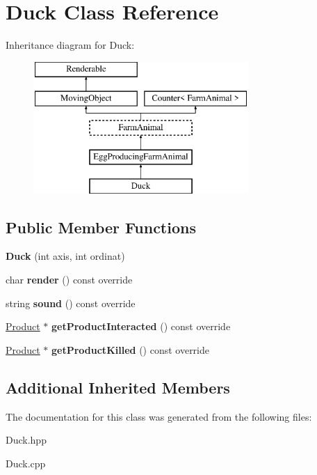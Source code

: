 \hypertarget{class_duck}{}\section{Duck Class Reference}
\label{class_duck}
Inheritance diagram for Duck\+:\begin{figure}[H]
\begin{center}
\leavevmode
\includegraphics[height=5.000000cm]{class_duck}
\end{center}
\end{figure}
\subsection*{Public Member Functions}
\begin{DoxyCompactItemize}
\item 
\mbox{\label{class_duck_af753d68ef796aaf70095505c701c36d7}} 
{\bfseries Duck} (int axis, int ordinat)
\item 
\mbox{\label{class_duck_affb64b601190dc21ea5fb068e3930f78}} 
char {\bfseries render} () const override
\item 
\mbox{\label{class_duck_a9f8f43e6ede727028e4251226710e411}} 
string {\bfseries sound} () const override
\item 
\mbox{\label{class_duck_a8eec99f2668ee7ba931b8e7b22a4f665}} 
\mbox{\hyperlink{class_product}{Product}} $\ast$ {\bfseries get\+Product\+Interacted} () const override
\item 
\mbox{\label{class_duck_ad5f96900a3eb5615870df6b328b4c2b1}} 
\mbox{\hyperlink{class_product}{Product}} $\ast$ {\bfseries get\+Product\+Killed} () const override
\end{DoxyCompactItemize}
\subsection*{Additional Inherited Members}


The documentation for this class was generated from the following files\+:\begin{DoxyCompactItemize}
\item 
Duck.\+hpp\item 
Duck.\+cpp\end{DoxyCompactItemize}
